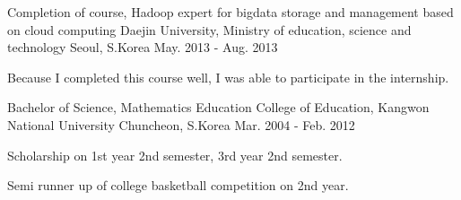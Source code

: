 

\begin{cventries}

  \cventry
    {Completion of course, Hadoop expert for bigdata storage and management based on cloud computing} %
    {Daejin University, Ministry of education, science and technology} %
    {Seoul, S.Korea} %
    {May. 2013 - Aug. 2013} %
    {
      \begin{cvitems} %
        \item {Because I completed this course well, I was able to participate in the internship.}
      \end{cvitems}
    }

  \cventry
    {Bachelor of Science, Mathematics Education} %
    {College of Education, Kangwon National University} %
    {Chuncheon, S.Korea} %
    {Mar. 2004 - Feb. 2012} %
    {
      \begin{cvitems} %
        \item {Scholarship on 1st year 2nd semester, 3rd year 2nd semester.}
        \item {Semi runner up of college basketball competition on 2nd year.}
      \end{cvitems}
    }

\end{cventries}
